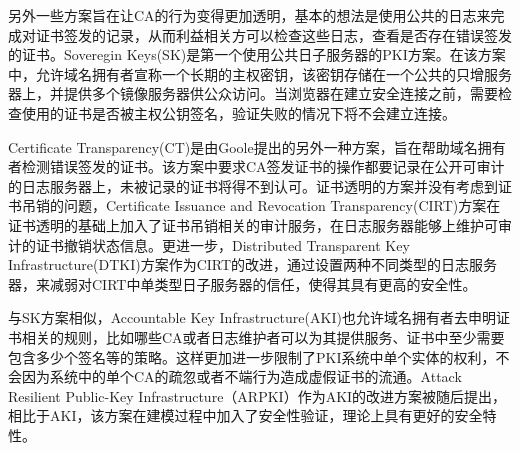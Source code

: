 另外一些方案旨在让CA的行为变得更加透明，基本的想法是使用公共的日志来完成对证书签发的记录，从而利益相关方可以检查这些日志，查看是否存在错误签发的证书。Soveregin Keys(SK)\cite{eckersley2012internet}是第一个使用公共日子服务器的PKI方案。在该方案中，允许域名拥有者宣称一个长期的主权密钥，该密钥存储在一个公共的只增服务器上，并提供多个镜像服务器供公众访问。当浏览器在建立安全连接之前，需要检查使用的证书是否被主权公钥签名，验证失败的情况下将不会建立连接。

Certificate Transparency(CT)\cite{laurie2013certificate}是由Goole提出的另外一种方案，旨在帮助域名拥有者检测错误签发的证书。该方案中要求CA签发证书的操作都要记录在公开可审计的日志服务器上，未被记录的证书将得不到认可。证书透明的方案并没有考虑到证书吊销的问题，Certificate Issuance and Revocation Transparency(CIRT)\cite{ryan2014enhanced}方案在证书透明的基础上加入了证书吊销相关的审计服务，在日志服务器能够上维护可审计的证书撤销状态信息。更进一步，Distributed Transparent Key Infrastructure(DTKI)\cite{cheval2014dtki}方案作为CIRT的改进，通过设置两种不同类型的日志服务器，来减弱对CIRT中单类型日子服务器的信任，使得其具有更高的安全性。


与SK方案相似，Accountable Key Infrastructure(AKI)\cite{kim2013accountable}也允许域名拥有者去申明证书相关的规则，比如哪些CA或者日志维护者可以为其提供服务、证书中至少需要包含多少个签名等的策略。这样更加进一步限制了PKI系统中单个实体的权利，不会因为系统中的单个CA的疏忽或者不端行为造成虚假证书的流通。Attack Resilient Public-Key Infrastructure（ARPKI）\cite{basin2014arpki}作为AKI的改进方案被随后提出，相比于AKI，该方案在建模过程中加入了安全性验证，理论上具有更好的安全特性。





%

